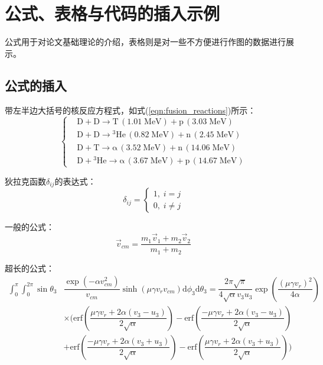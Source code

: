 \chapter{公式、表格与代码的插入示例}
\label{cha:for_tab_example}
公式用于对论文基础理论的介绍，表格则是对一些不方便进行作图的数据进行展示。

\section{公式的插入}
\label{sec:formula}
带左半边大括号的核反应方程式，如式(\ref{eqn:fusion_reactions})所示：
\begin{equation}
	\label{eqn:fusion_reactions}
	\left\{
	\begin{aligned}
		&\mbox{D}+\mbox{D}\rightarrow \mbox{T}\,(\text{1.01}\;\mbox{MeV})+\mbox{p}\,(\text{3.03}\;\mbox{MeV}) \\
		&\mbox{D}+\mbox{D}\rightarrow {^{\text{3}}}\mbox{He}\,(\text{0.82}\;\mbox{MeV})+\mbox{n}\,(\text{2.45}\;\mbox{MeV}) \\
		&\mbox{D}+\mbox{T}\rightarrow \text{α}\,(\text{3.52}\;\mbox{MeV})+\mbox{n}\,(\text{14.06}\;\mbox{MeV}) \\
		&\mbox{D}+{^{\text{3}}}\mbox{He}\rightarrow \text{α}\,(\text{3.67}\;\mbox{MeV})+\mbox{p}\,(\text{14.67}\;\mbox{MeV})
	\end{aligned}
	\right.
\end{equation}

狄拉克函数$\delta_{ij}$的表达式：
\begin{equation}
	\label{eqn:delta_ij}
	\delta_{ij}=\left\{
	\begin{aligned}
		1,\; i=j \\
		0,\; i\neq j
	\end{aligned}
	\right.
\end{equation}

一般的公式：
\begin{equation}
	\label{eqn:vec_v_cm}
	\vec{v}_{cm}=\dfrac{m_{1}\vec{v}_{1}+m_{2}\vec{v}_{2}}{m_{1}+m_{2}}
\end{equation}

超长的公式\cite{appelbe2011production}：
\begin{equation}
	\label{eqn:iint_theta3_phi3}
	\begin{split}
		\int_{0}^{\pi}\int_{0}^{2\pi} \sin\theta_{3}&\dfrac{\exp(-\alpha v_{cm}^{2})}{v_{cm}}\sinh(\mu \gamma v_{r}v_{cm})\mbox{d}\phi_{3}\mbox{d}\theta_{3}=\dfrac{2\pi \sqrt{\pi}}{4\sqrt{\alpha}v_{3}u_{3}}\exp\left( \dfrac{(\mu \gamma v_{r})^{2}}{4\alpha} \right) \\
		&\times \Bigg( \mbox{erf}\left( \dfrac{\mu \gamma v_{r}+2\alpha(v_{3}-u_{3})}{2\sqrt{\alpha}} \right)-\mbox{erf}\left( \dfrac{-\mu \gamma v_{r}+2\alpha(v_{3}-u_{3})}{2\sqrt{\alpha}} \right) \\
		&+\mbox{erf}\left( \dfrac{-\mu \gamma v_{r}+2\alpha(v_{3}+u_{3})}{2\sqrt{\alpha}} \right)-\mbox{erf}\left( \dfrac{\mu \gamma v_{r}+2\alpha(v_{3}+u_{3})}{2\sqrt{\alpha}} \right) \Bigg)
	\end{split}
\end{equation}

